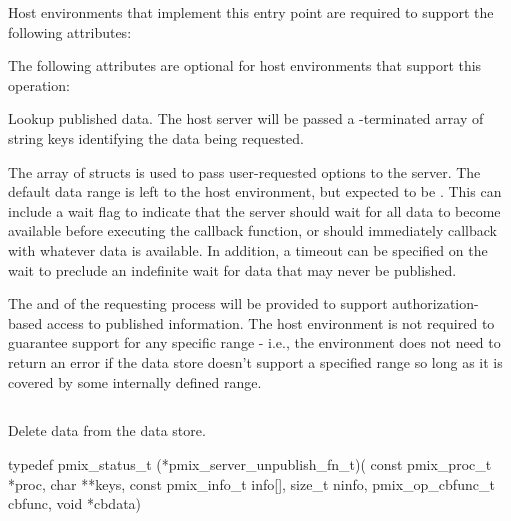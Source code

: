 
\divider

Host environments that implement this entry point are required to support the following attributes:


\reqattrend

\optattrstart
The following attributes are optional for host environments that support this operation:


\optattrend


\descr

Lookup published data.
The host server will be passed a -terminated array of string keys identifying the data being requested.

The array of  structs is used to pass user-requested options to the server. The default data range is left to the host environment, but expected to be .
This can include a wait flag to indicate that the server should wait for all data to become available before executing the callback function, or should immediately callback with whatever data is available.
In addition, a timeout can be specified on the wait to preclude an indefinite wait for data that may never be published.

\advicermstart
The  and  of the requesting process will be provided to support authorization-based access to published information. The host environment is not required to guarantee support for any specific range - i.e., the environment does not need to return an error if the data store doesn't support a specified range so long as it is covered by some internally defined range.
\advicermend

\subsection{}

\summary

Delete data from the data store.

\format

\cspecificstart
\begin{codepar}
typedef pmix_status_t (*pmix_server_unpublish_fn_t)(
                             const pmix_proc_t *proc,
                             char **keys,
                             const pmix_info_t info[],
                             size_t ninfo,
                             pmix_op_cbfunc_t cbfunc,
                             void *cbdata)
\end{codepar}
\cspecificend

